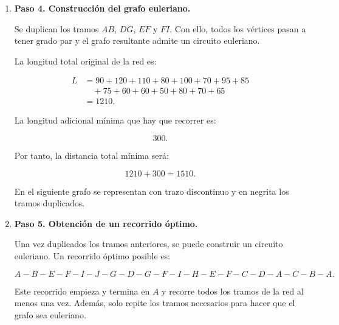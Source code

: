 \begin{enumerate}
\begin{center}
\end{center}

\item \textbf{Paso 4. Construcción del grafo euleriano.}

Se duplican los tramos $AB$, $DG$, $EF$ y $FI$. Con ello, todos los vértices pasan a tener grado par y el grafo resultante admite un circuito euleriano.

La longitud total original de la red es:

\[
\begin{aligned}
L
&=90+120+110+80+100+70+95+85\\
&\quad +75+60+60+50+80+70+65\\
&=1210.
\end{aligned}
\]

La longitud adicional mínima que hay que recorrer es:

\[
300.
\]

Por tanto, la distancia total mínima será:

\[
1210+300=1510.
\]

En el siguiente grafo se representan con trazo discontinuo y en negrita los tramos duplicados.

\begin{center}
\end{center}

\item \textbf{Paso 5. Obtención de un recorrido óptimo.}

Una vez duplicados los tramos anteriores, se puede construir un circuito euleriano. Un recorrido óptimo posible es:

\[
A-B-E-F-I-J-G-D-G-F-I-H-E-F-C-D-A-C-B-A.
\]

Este recorrido empieza y termina en $A$ y recorre todos los tramos de la red al menos una vez. Además, solo repite los tramos necesarios para hacer que el grafo sea euleriano.


\end{enumerate}
